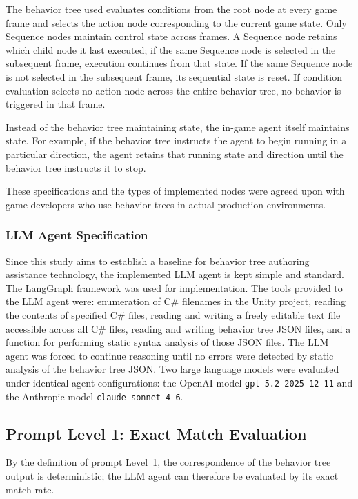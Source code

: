\documentclass[conference]{IEEEtran}
\begin{document}
The behavior tree used evaluates conditions from the root node at every game frame and selects the action node corresponding to the current game state. Only Sequence nodes maintain control state across frames. A Sequence node retains which child node it last executed; if the same Sequence node is selected in the subsequent frame, execution continues from that state. If the same Sequence node is not selected in the subsequent frame, its sequential state is reset. If condition evaluation selects no action node across the entire behavior tree, no behavior is triggered in that frame.

Instead of the behavior tree maintaining state, the in-game agent itself maintains state. For example, if the behavior tree instructs the agent to begin running in a particular direction, the agent retains that running state and direction until the behavior tree instructs it to stop.

These specifications and the types of implemented nodes were agreed upon with game developers who use behavior trees in actual production environments.

\subsubsection{LLM Agent Specification}

Since this study aims to establish a baseline for behavior tree authoring assistance technology, the implemented LLM agent is kept simple and standard. The LangGraph framework was used for implementation. The tools provided to the LLM agent were: enumeration of C\# filenames in the Unity project, reading the contents of specified C\# files, reading and writing a freely editable text file accessible across all C\# files, reading and writing behavior tree JSON files, and a function for performing static syntax analysis of those JSON files. The LLM agent was forced to continue reasoning until no errors were detected by static analysis of the behavior tree JSON. Two large language models were evaluated under identical agent configurations: the OpenAI model \texttt{gpt-5.2-2025-12-11} and the Anthropic model \texttt{claude-sonnet-4-6}.

\subsection{Prompt Level 1: Exact Match Evaluation}

By the definition of prompt Level~1, the correspondence of the behavior tree output is deterministic; the LLM agent can therefore be evaluated by its exact match rate.
\end{document}
